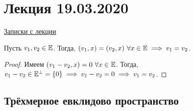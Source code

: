 \section{Лекция 19.03.2020} 

\href{https://www.dropbox.com/s/y3r4x7mjt7iv71a/%D0%9B%D0%90%D0%B8%D0%93_19-20_%D0%9B%D0%B5%D0%BA%D1%86%D0%B8%D1%8F_25.pdf?dl=0}{Записки с лекции}


\begin{lemma}
    Пусть $v_1, v_2 \in \mathbb{E}$. Тогда, $(v_1, x) = (v_2, x) \ \forall x \in \mathbb{E} \implies v_1 = v_2$.
\end{lemma}

\begin{proof}
    Имеем $(v_1 - v_2, x) = 0 \ \forall x \in \EE$.
    Тогда, $v_1 - v_2 \in \mathbb{E}^{\perp} = \{0\} \implies v_1 - v_2 = 0 \implies v_1 = v_2$.
\end{proof}


\subsection{Трёхмерное евклидово пространство}


